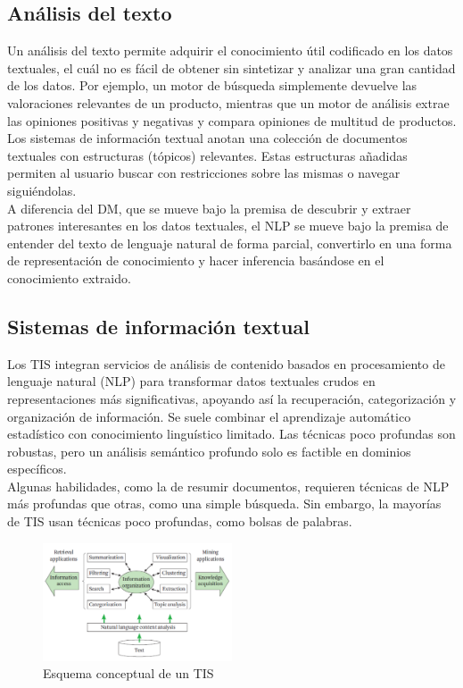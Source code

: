 \subsection{Análisis del texto}

Un análisis del texto permite adquirir el conocimiento útil codificado en los datos textuales, el cuál no es fácil de obtener sin sintetizar y analizar una gran cantidad de los datos. Por ejemplo, un motor de búsqueda simplemente devuelve las valoraciones relevantes de un producto, mientras que un motor de análisis extrae las opiniones positivas y negativas y compara opiniones de multitud de productos. \\

Los sistemas de información textual anotan una colección de documentos textuales con estructuras (tópicos) relevantes. Estas estructuras añadidas permiten al usuario buscar con restricciones sobre las mismas o navegar siguiéndolas. \\

A diferencia del DM, que se mueve bajo la premisa de descubrir y extraer patrones interesantes en los datos textuales, el NLP se mueve bajo la premisa de entender del texto de lenguaje natural de forma parcial, convertirlo en una forma de representación de conocimiento y hacer inferencia basándose en el conocimiento extraido. 

\subsection{Sistemas de información textual}
Los TIS integran servicios de análisis de contenido basados en procesamiento de lenguaje natural (NLP) para transformar datos textuales crudos en representaciones más significativas, apoyando así la recuperación, categorización y organización de información. Se suele combinar el aprendizaje automático estadístico con conocimiento linguístico limitado. Las técnicas poco profundas son robustas, pero un análisis semántico profundo solo es factible en dominios específicos. \\

Algunas habilidades, como la de resumir documentos, requieren técnicas de NLP más profundas que otras, como una simple búsqueda. Sin embargo, la mayorías de TIS usan técnicas poco profundas, como bolsas de palabras. 

\begin{figure}[h]
\centering
\includegraphics[width=0.5\textwidth]{fotos/1.png}
\caption{Esquema conceptual de un TIS}
\label{fig:1}
\end{figure}

